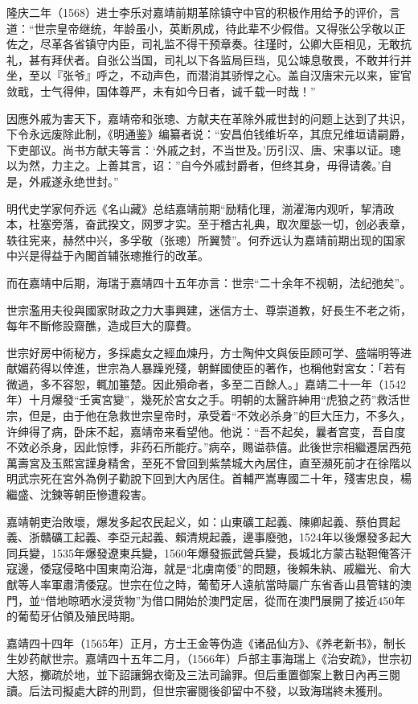 隆庆二年（1568）进士李乐对嘉靖前期革除镇守中官的积极作用给予的评价，言道：“世宗皇帝继统，年龄虽小，英断夙成，待此辈不少假借。又得张公孚敬以正佐之，尽革各省镇守内臣，司礼监不得干预章奏。往瑾时，公卿大臣相见，无敢抗礼，甚有拜伏者。自张公当国，司礼以下各监局巨珰，见公竦息敬畏，不敢并行并坐，至以『张爷』呼之，不动声色，而潜消其骄悍之心。盖自汉唐宋元以来，宦官敛戢，士气得伸，国体尊严，未有如今日者，诚千载一时哉！”

因應外戚为害天下，嘉靖帝和张璁、方献夫在革除外戚世封的问题上达到了共识，下令永远废除此制，《明通鉴》编纂者说：“安昌伯钱维圻卒，其庶兄维垣请嗣爵，下吏部议。尚书方献夫等言：‘外戚之封，不当世及。’历引汉、唐、宋事以证。璁以为然，力主之。上善其言，诏：”自今外戚封爵者，但终其身，毋得请袭。’自是，外戚遂永绝世封。”

明代史学家何乔远《名山藏》总结嘉靖前期“励精化理，湔濯海内观听，挈清政本，杜塞旁落，奋武揆文，网罗才实。至于稽古礼典，取次厘毖一切，创必表章，轶往宪来，赫然中兴，多孚敬（张璁）所翼赞”。何乔远认为嘉靖前期出现的国家中兴是得益于內閣首辅张璁推行的改革。

而在嘉靖中后期，海瑞于嘉靖四十五年亦言：世宗“二十余年不视朝，法纪弛矣”。

世宗濫用夫役與國家財政之力大事興建，迷信方士、尊崇道教，好長生不老之術，每年不斷修設齋醮，造成巨大的靡費。

世宗好房中術秘方，多採處女之經血煉丹，方士陶仲文與佞臣顾可学、盛端明等进献媚药得以倖進，世宗為人暴躁兇殘，朝鮮國使臣的著作，也稱他對宮女：「若有微過，多不容恕，輒加箠楚。因此殞命者，多至二百餘人。」嘉靖二十一年（1542年）十月爆發“壬寅宮變”，幾死於宮女之手。明朝的太醫許紳用“虎狼之药”救活世宗，但是，由于他在急救世宗皇帝时，承受着“不效必杀身”的巨大压力，不多久，许绅得了病，卧床不起，嘉靖帝来看望他。他说：“吾不起矣，曩者宫变，吾自度不效必杀身，因此惊悸，非药石所能疗。”病卒，赐谥恭僖。此後世宗相繼遷居西苑萬壽宮及玉熙宮謹身精舍，至死不曾回到紫禁城大內居住，直至瀕死前才在徐階以明武宗死在宮外為例子勸說下回到大內居住。首輔严嵩專國二十年，殘害忠良，楊繼盛、沈鍊等朝臣慘遭殺害。

嘉靖朝吏治敗壞，爆发多起农民起义，如：山東礦工起義、陳卿起義、蔡伯貫起義、浙贛礦工起義、李亞元起義、賴清規起義，邊事廢弛，1524年以後爆發多起大同兵變，1535年爆發遼東兵變，1560年爆發振武營兵變，長城北方蒙古鞑靼俺答汗寇邊，倭寇侵略中国東南沿海，就是“北虜南倭”的問題，後賴朱紈、戚繼光、俞大猷等人率軍肅清倭寇。世宗在位之時，葡萄牙人遠航當時屬广东省香山县管辖的澳門，並“借地晾晒水浸货物”为借口開始於澳門定居，從而在澳門展開了接近450年的葡萄牙佔領及殖民時期。

嘉靖四十四年（1565年）正月，方士王金等伪造《诸品仙方》、《养老新书》，制长生妙药献世宗。嘉靖四十五年二月，（1566年）戶部主事海瑞上《治安疏》，世宗初大怒，擲疏於地，並下詔讓錦衣衛及三法司論罪。但后重置御案上數日內再三閱讀。后法司擬處大辟的刑罰，但世宗審閱後卻留中不發，以致海瑞終未獲刑。


